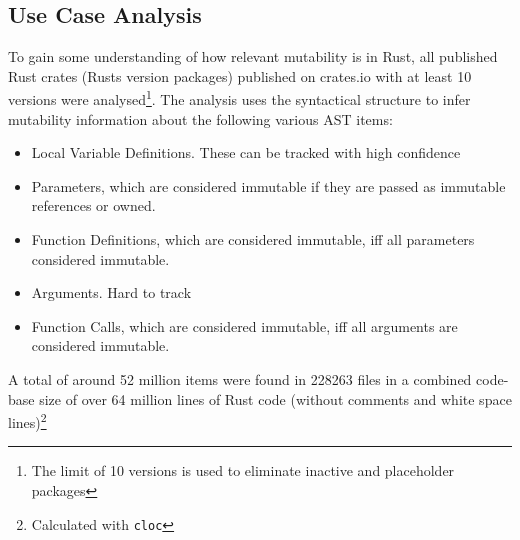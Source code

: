 \documentclass[11pt]{article}
\begin{document}
\newpage
\begin{appendices}

\section{Use Case Analysis}

To gain some understanding of how relevant mutability is in Rust, all published Rust crates (Rusts version packages) published on crates.io with at least 10 versions were analysed\footnote{The limit of 10 versions is used to eliminate inactive and placeholder packages}. The analysis uses the syntactical structure to infer mutability information about the following various AST items: 
\begin{itemize}
	\item Local Variable Definitions. These can be tracked with high confidence
	\item Parameters, which are considered immutable if they are passed as immutable references or owned.
	\item Function Definitions, which are considered immutable, iff all parameters considered immutable.
	\item Arguments. Hard to track
	\item Function Calls, which are considered immutable, iff all arguments are considered immutable.
\end{itemize}
A total of around 52 million items were found in 228263 files in a combined code-base size of over 64 million lines of Rust code (without comments and white space lines)\footnote{Calculated with \texttt{cloc}}




\end{appendices}
\end{document}
